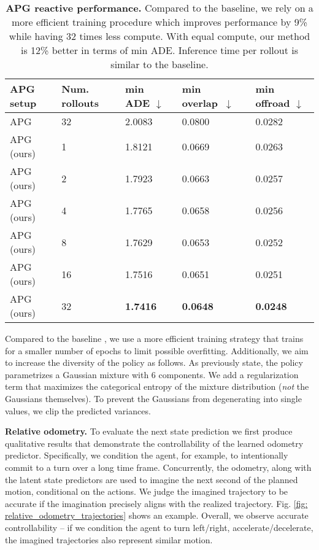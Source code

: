 \begin{table}[h]
    \small
    \centering
    \begin{tabular}[width=\textwidth]{ p{} | p{} | p{} p{} p{} } \toprule[1.5pt]
         \textbf{APG setup} & Num. rollouts & min ADE $\downarrow$ & min \mbox{overlap $\downarrow$} &  min offroad $\downarrow$  \\
         \midrule[1pt]
         APG \cite{nachkov2024autonomous} & 32 & 2.0083 &  0.0800 & 0.0282 \\
         APG (ours) & 1 & 1.8121 & 0.0669 & 0.0263 \\
         APG (ours) & 2 & 1.7923 & 0.0663 & 0.0257 \\
         APG (ours) & 4 & 1.7765 & 0.0658 & 0.0256 \\
         APG (ours) & 8 & 1.7629 & 0.0653 & 0.0252 \\
         APG (ours) & 16 & 1.7516 & 0.0651 & 0.0251 \\
         APG (ours) & 32 & \textbf{1.7416} & \textbf{0.0648} & \textbf{0.0248} \\
         \bottomrule[1.5pt]
    \end{tabular}
    \captionsetup{aboveskip=0.3cm, belowskip=-0.3cm}
    \caption{\textbf{APG reactive performance.} Compared to the baseline, we rely on a more efficient training procedure which improves performance by 9\% while having 32 times less compute. With equal compute, our method is 12\% better in terms of min ADE. Inference time per rollout is similar to the baseline.}
    \label{table: reactive_apg_performance}
\end{table}

Compared to the baseline \cite{nachkov2024autonomous}, we use a more efficient training strategy that trains for a smaller number of epochs to limit possible overfitting. Additionally, we aim to increase the diversity of the policy as follows. As previously state, the policy parametrizes a Gaussian mixture with 6 components. We add a regularization term that maximizes the categorical entropy of the mixture distribution (\emph{not} the Gaussians themselves). To prevent the Gaussians from degenerating into single values, we clip the predicted variances.


\textbf{Relative odometry.} To evaluate the next state prediction we first produce qualitative results that demonstrate the controllability of the learned odometry predictor. Specifically, we condition the agent, for example, to intentionally commit to a turn over a long time frame. Concurrently, the odometry, along with the latent state predictors are used to imagine the next second of the planned motion, conditional on the actions. We judge the imagined trajectory to be accurate if the imagination precisely aligns with the realized trajectory. Fig. \ref{fig: relative_odometry_trajectories} shows an example. Overall, we observe accurate controllability -- if we condition the agent to turn left/right, accelerate/decelerate, the imagined trajectories also represent similar motion.

